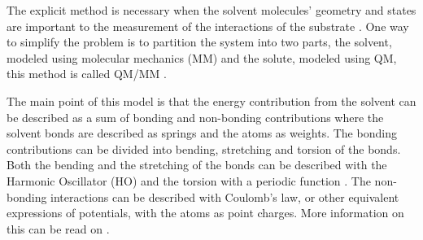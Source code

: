 \documentclass[../Thesis.tex]{subfiles}
\begin{document}
The explicit method is necessary when the solvent molecules' geometry and states
are important to the measurement of the interactions of the substrate
\cite{Cramer:2004}.
One way to simplify the problem is to partition the system into two parts, the
solvent, modeled using molecular mechanics (MM) and the solute, modeled using
\ac{QM}, this method is called QM/MM \cite{Mennucci:2018}.

The main point of this model is that the energy contribution from the solvent
can be described as a sum of bonding and non-bonding contributions
\cite{Cramer:2004} where the solvent bonds are described as springs
\cite{Mennucci:2018} and the atoms as weights. The bonding contributions can be
divided into bending, stretching and torsion of the bonds. Both the bending
and the stretching of the bonds can be described with the Harmonic Oscillator
(HO) and the torsion with a periodic function \cite{Mennucci:2018}. The
non-bonding interactions can be described with Coulomb's law, or other equivalent
expressions of potentials, with the atoms as point charges. More information on
this can be read on \cite{Cramer:2004, Jensen:2017}.
\end{document}
